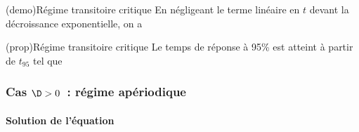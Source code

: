 \documentclass[../../main/main.tex]{subfiles}
\begin{document}
\begin{tcb*}[label=demo:transicrit](demo){Régime transitoire critique}
	En négligeant le terme linéaire en $t$ devant la décroissance
	exponentielle, on a
	\vspace{-15pt}
\end{tcb*}
\begin{tcb*}[label=prop:transicrit](prop){Régime transitoire critique}
	Le temps de réponse à 95\% est atteint à partir de $t_{95}$ tel que
	\vspace{-15pt}
\end{tcb*}

\subsubsection{Cas $\D > 0$~: régime apériodique}
\paragraph{Solution de l'équation}
~\smallbreak
\end{document}
